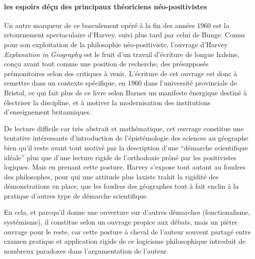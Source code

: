 \paragraph{les espoirs déçu des principaux théoriciens néo-positivistes}


Un autre marqueur de ce basculement opéré à la fin des années 1960 est la retournement spectaculaire d'Harvey, suivi plus tard par celui de Bunge. Connu pour son exploitation de la philosophie néo-positiviste, l'ouvrage d'Harvey \textit{Explanation in Geography} est le fruit d'un travail d'écriture de longue haleine, conçu avant tout comme une position de recherche, des présupposés prémonitoires selon \textcite[47]{Barnes2006} des critiques à venir. L'écriture de cet ouvrage est donc à remettre dans un contexte spécifique, en 1960 dans l'université provinciale de Bristol, ce qui fait plus de ce livre selon Barnes \autocite[31-36]{Barnes2006} un manifeste énergique destiné à électriser la discipline, et à motiver la modernisation des institutions d'enseignement britanniques.

De lecture difficile car très abstrait et mathématique, cet ouvrage constitue une tentative intéressante d'introduction de l'épistémologie des sciences au géographe bien qu'il reste avant tout motivé par la description d'une \enquote{démarche scientifique idéale} plus que d'une lecture rigide de l'orthodoxie prôné par les positivistes logiques. Mais en prenant cette posture, Harvey s'expose tout autant au foudres des philosophes, pour qui une attitude plus laxiste trahit la rigidité des démonstrations en place, que les foudres des géographes tout à fait enclin à la pratique d'autres type de démarche scientifique.

En cela, et parcqu'il donne une ouverture sur d'autres démarches (fonctionalisme, systémisme), il constitue selon \textcite{Gale1972} un ouvrage propice aux débats, mais un piètre ouvrage pour le reste, car cette posture à cheval de l'auteur souvent partagé entre examen pratique et application rigide de ce logicisme philosophique introduit de nombreux paradoxes dans l'argumentation de l'auteur.

